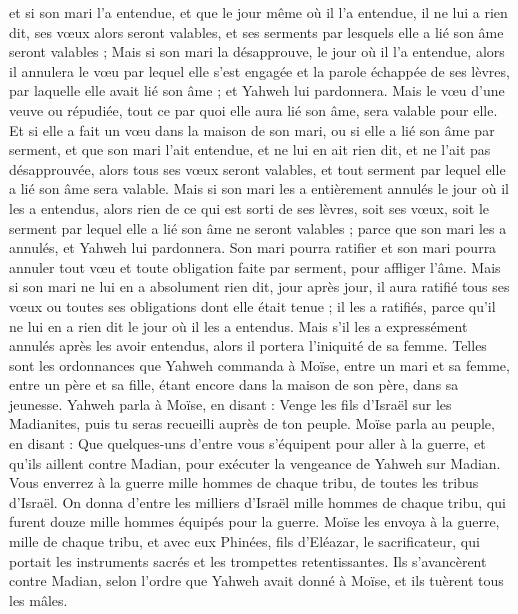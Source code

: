 \begin{multicols}{2}
et si son mari l’a entendue, et que le jour même où il l’a entendue, il ne lui a rien dit, ses vœux alors seront valables, et ses serments par lesquels elle a lié son âme seront valables ;
Mais si son mari la désapprouve, le jour où il l'a entendue, alors il annulera le vœu par lequel elle s’est engagée et la parole échappée de ses lèvres, par laquelle elle avait lié son âme ; et Yahweh lui pardonnera.
Mais le vœu d’une veuve ou répudiée, tout ce par quoi elle aura lié son âme, sera valable pour elle.
Et si elle a fait un vœu dans la maison de son mari, ou si elle a lié son âme par serment,
et que son mari l’ait entendue, et ne lui en ait rien dit, et ne l’ait pas désapprouvée, alors tous ses vœux seront valables, et tout serment par lequel elle a lié son âme sera valable.
Mais si son mari les a entièrement annulés le jour où il les a entendus, alors rien de ce qui est sorti de ses lèvres, soit ses vœux, soit le serment par lequel elle a lié son âme ne seront valables ; parce que son mari les a annulés, et Yahweh lui pardonnera.
Son mari pourra ratifier et son mari pourra annuler tout vœu et toute obligation faite par serment, pour affliger l’âme.
Mais si son mari ne lui en a absolument rien dit, jour après jour, il aura ratifié tous ses vœux ou toutes ses obligations dont elle était tenue ; il les a ratifiés, parce qu’il ne lui en a rien dit le jour où il les a entendus.
Mais s’il les a expressément annulés après les avoir entendus, alors il portera l’iniquité de sa femme.
Telles sont les ordonnances que Yahweh commanda à Moïse, entre un mari et sa femme, entre un père et sa fille, étant encore dans la maison de son père, dans sa jeunesse.
\VerseOne{}Yahweh parla à Moïse, en disant :
Venge les fils d'Israël sur les Madianites, puis tu seras recueilli auprès de ton peuple.
Moïse parla au peuple, en disant : Que quelques-uns d'entre vous s'équipent pour aller à la guerre, et qu'ils aillent contre Madian, pour exécuter la vengeance de Yahweh sur Madian.
Vous enverrez à la guerre mille hommes de chaque tribu, de toutes les tribus d'Israël.
On donna d'entre les milliers d'Israël mille hommes de chaque tribu, qui furent douze mille hommes équipés pour la guerre.
Moïse les envoya à la guerre, mille de chaque tribu, et avec eux Phinées, fils d'Eléazar, le sacrificateur, qui portait les instruments sacrés et les trompettes retentissantes.
Ils s’avancèrent contre Madian, selon l’ordre que Yahweh avait donné à Moïse, et ils tuèrent tous les mâles.

\end{multicols}
